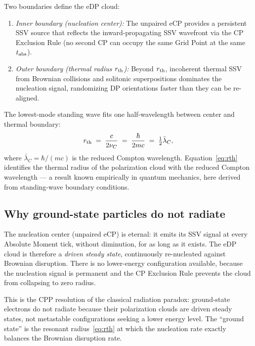 \documentclass[12pt]{article}
\newcommand{\nuC}{\nu_C}
\newcommand{\lambdabar}{\bar{\lambda}}
\begin{document}
Two boundaries define the eDP cloud:

\begin{enumerate}[noitemsep]
  \item \emph{Inner boundary (nucleation center):} The unpaired eCP provides
    a persistent SSV source that reflects the inward-propagating SSV
    wavefront via the CP Exclusion Rule (no second CP can occupy the same
    Grid Point at the same $t_{\rm abs}$).

  \item \emph{Outer boundary (thermal radius $r_{\rm th}$):} Beyond $r_{\rm
    th}$, incoherent thermal SSV from Brownian collisions and solitonic
    superpositions dominates the nucleation signal, randomizing DP
    orientations faster than they can be re-aligned.
\end{enumerate}

The lowest-mode standing wave fits one half-wavelength between center and
thermal boundary:
\begin{equation}
  r_{\rm th} \;=\; \frac{c}{2\nuC} \;=\; \frac{\hbar}{2mc}
  \;=\; \tfrac{1}{2}\lambdabar_C,
  \label{eq:rth}
\end{equation}
where $\lambdabar_C = \hbar/(mc)$ is the reduced Compton wavelength.
Equation~\eqref{eq:rth} identifies the thermal radius of the polarization
cloud with the reduced Compton wavelength --- a result known empirically
in quantum mechanics, here derived from standing-wave boundary conditions.

\subsection{Why ground-state particles do not radiate}

The nucleation center (unpaired eCP) is eternal: it emits its SSV signal
at every Absolute Moment tick, without diminution, for as long as it exists.
The eDP cloud is therefore a \emph{driven steady state}, continuously
re-nucleated against Brownian disruption.  There is no lower-energy
configuration available, because the nucleation signal is permanent and the
CP Exclusion Rule prevents the cloud from collapsing to zero radius.

This is the CPP resolution of the classical radiation paradox: ground-state
electrons do not radiate because their polarization clouds are driven steady
states, not metastable configurations seeking a lower energy level.  The
``ground state'' is the resonant radius~\eqref{eq:rth} at which the
nucleation rate exactly balances the Brownian disruption rate.
\end{document}

